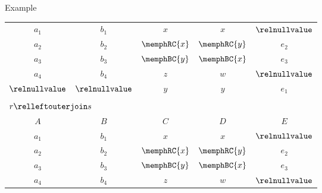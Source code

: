 \begin{multicols}{2}
\begin{CheatsheetEntryFrame}
\begin{RelAlgSubsection}{Example}
\begin{center}
{\begin{tabular}{|ccccc|}
                        \\ \hline\hline
                    $a_1$           & $b_1$           & $x$           & $x$           & $\relnullvalue$ \\
                    $a_2$           & $b_2$           & $\memphRC{x}$ & $\memphRC{y}$ & $e_2$           \\
                    $a_3$           & $b_3$           & $\memphBC{y}$ & $\memphBC{x}$ & $e_3$           \\
                    $a_4$           & $b_4$           & $z$           & $w$           & $\relnullvalue$ \\
                    $\relnullvalue$ & $\relnullvalue$ & $y$           & $y$           & $e_1$           \\ \hline
                    \multicolumn{5}{c}{} \\ %
                    \multicolumn{5}{l}{\normalsize $r \relleftouterjoin s$}
                        \\ \hline
                    \multicolumn{1}{|c}{$A$}
                        & \multicolumn{1}{c}{$B$}
                        & \multicolumn{1}{c}{$C$}
                        & \multicolumn{1}{c}{$D$}
                        & \multicolumn{1}{c|}{$E$}
                        \\ \hline\hline
                    $a_1$           & $b_1$           & $x$           & $x$           & $\relnullvalue$ \\
                    $a_2$           & $b_2$           & $\memphRC{x}$ & $\memphRC{y}$ & $e_2$           \\
                    $a_3$           & $b_3$           & $\memphBC{y}$ & $\memphBC{x}$ & $e_3$           \\
                    $a_4$           & $b_4$           & $z$           & $w$           & $\relnullvalue$ \\ \hline
                \end{tabular}
            }
        \end{center}
        \end{RelAlgSubsection}

    \end{CheatsheetEntryFrame}
    
\end{multicols}
\newpage
